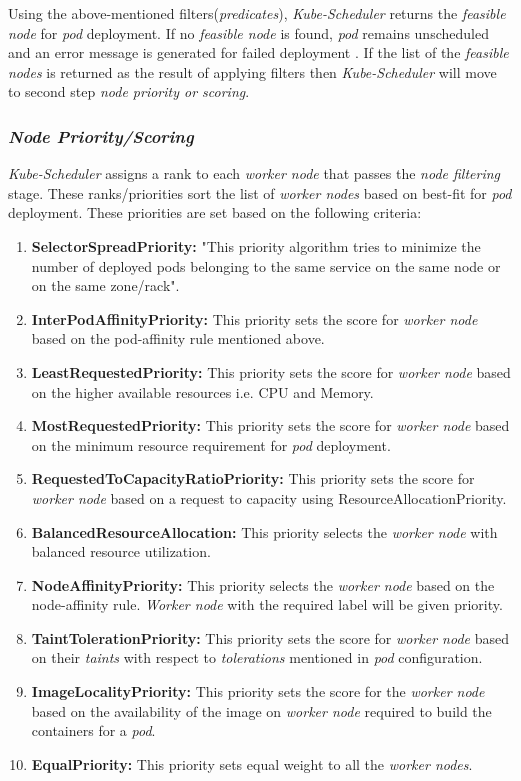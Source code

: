 Using the above-mentioned filters(\emph{predicates}), \emph{Kube-Scheduler} returns the \emph{feasible node} for \emph{pod} deployment. If no \emph{feasible node} is found, \emph{pod} remains unscheduled and an error message is generated for failed deployment \cite{Santos2019}. If the list of the \emph{feasible nodes} is returned as the result of applying filters then \emph{Kube-Scheduler} will move to second step \emph{node priority or scoring}.
\subsubsection{\emph{Node Priority/Scoring}}
\label{sec:node-priority}
\emph{Kube-Scheduler} assigns a rank to each \emph{worker node} that passes the \emph{node filtering} stage. These ranks/priorities sort the list of \emph{worker nodes} based on best-fit for \emph{pod} deployment\cite{Santos2019}. These priorities are set based on the following criteria\cite{k8s}:
\begin{enumerate}
  \item \textbf{SelectorSpreadPriority:} "This priority algorithm tries to minimize the number of deployed pods belonging to the same service on the same node or on the same zone/rack"\cite{Santos2019}.
  \item \textbf{InterPodAffinityPriority:} This priority sets the score for \emph{worker node} based on the pod-affinity rule mentioned above.
  \item \textbf{LeastRequestedPriority:} This priority sets the score for \emph{worker node} based on the higher available resources i.e. CPU and Memory.
  \item \textbf{MostRequestedPriority:} This priority sets the score for \emph{worker node} based on the minimum resource requirement for \emph{pod} deployment.
  \item \textbf{RequestedToCapacityRatioPriority:} This priority sets the score for \emph{worker node} based on a request to capacity using ResourceAllocationPriority.
  \item \textbf{BalancedResourceAllocation:} This priority selects the \emph{worker node} with balanced resource utilization.
  \item \textbf{NodeAffinityPriority:} This priority selects the \emph{worker node} based on the node-affinity rule. \emph{Worker node} with the required label will be given priority.
  \item \textbf{TaintTolerationPriority:} This priority sets the score for \emph{worker node} based on their \emph{taints} with respect to \emph{tolerations} mentioned in \emph{pod} configuration\cite{Santos2019}.
  \item \textbf{ImageLocalityPriority:} This priority sets the score for the \emph{worker node} based on the availability of the image on \emph{worker node} required to build the containers for a \emph{pod}.
  \item \textbf{EqualPriority:} This priority sets equal weight to all the \emph{worker nodes}.
\end{enumerate}
